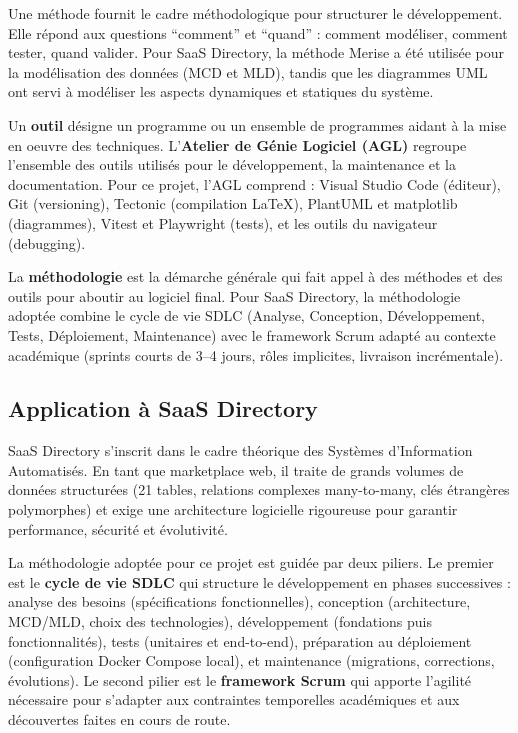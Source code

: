 Une méthode fournit le cadre méthodologique pour structurer le développement. Elle répond aux questions ``comment'' et ``quand'' : comment modéliser, comment tester, quand valider. Pour SaaS Directory, la méthode Merise a été utilisée pour la modélisation des données (MCD et MLD), tandis que les diagrammes UML ont servi à modéliser les aspects dynamiques et statiques du système.

Un \textbf{outil} désigne un programme ou un ensemble de programmes aidant à la mise en oeuvre des techniques. L'\textbf{Atelier de Génie Logiciel (AGL)} regroupe l'ensemble des outils utilisés pour le développement, la maintenance et la documentation. Pour ce projet, l'AGL comprend : Visual Studio Code (éditeur), Git (versioning), Tectonic (compilation LaTeX), PlantUML et matplotlib (diagrammes), Vitest et Playwright (tests), et les outils du navigateur (debugging).

La \textbf{méthodologie} est la démarche générale qui fait appel à des méthodes et des outils pour aboutir au logiciel final. Pour SaaS Directory, la méthodologie adoptée combine le cycle de vie SDLC (Analyse, Conception, Développement, Tests, Déploiement, Maintenance) avec le framework Scrum adapté au contexte académique (sprints courts de 3--4 jours, rôles implicites, livraison incrémentale).

\subsection{Application à SaaS Directory}

SaaS Directory s'inscrit dans le cadre théorique des Systèmes d'Information Automatisés. En tant que marketplace web, il traite de grands volumes de données structurées (21 tables, relations complexes many-to-many, clés étrangères polymorphes) et exige une architecture logicielle rigoureuse pour garantir performance, sécurité et évolutivité.

La méthodologie adoptée pour ce projet est guidée par deux piliers. Le premier est le \textbf{cycle de vie SDLC} qui structure le développement en phases successives : analyse des besoins (spécifications fonctionnelles), conception (architecture, MCD/MLD, choix des technologies), développement (fondations puis fonctionnalités), tests (unitaires et end-to-end), préparation au déploiement (configuration Docker Compose local), et maintenance (migrations, corrections, évolutions). Le second pilier est le \textbf{framework Scrum} qui apporte l'agilité nécessaire pour s'adapter aux contraintes temporelles académiques et aux découvertes faites en cours de route.

